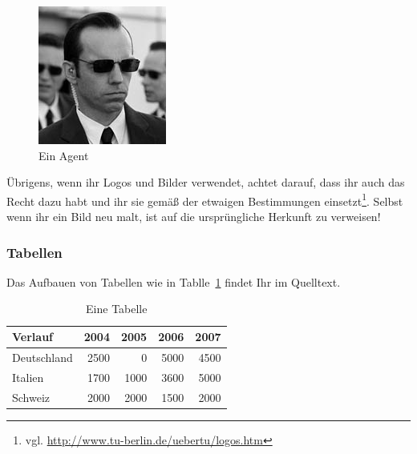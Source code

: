 \begin{figure}[htb]
	
	\centering
		
		\includegraphics{figures/agent.jpg}
	
	\caption{Ein Agent}
	
	\label{fig:agent}

\end{figure}

Übrigens, wenn ihr Logos und Bilder verwendet, achtet darauf, dass ihr auch das Recht dazu habt und ihr sie gemäß der etwaigen Bestimmungen einsetzt\footnote{vgl. \url{http://www.tu-berlin.de/uebertu/logos.htm}}. Selbst wenn ihr ein Bild neu malt, ist auf die ursprüngliche Herkunft zu verweisen!


\subsubsection{Tabellen}
Das Aufbauen von Tabellen wie in Tablle~\ref{tab:EineTabelle} findet Ihr im Quelltext.
\begin{table}[ht]
	\centering

	\caption{Eine Tabelle}

\begin{tabular}{||l|r|r|r|r||}

\hline
Verlauf &       2004 &       2005 &       2006 &       2007 \\

\hline
\hline
Deutschland &       2500 &          0 &       5000 &       4500 \\
\hline
   Italien &       1700 &       1000 &       3600 &       5000 \\
\hline
   Schweiz &       2000 &       2000 &       1500 &       2000 \\
\hline
\end{tabular}  
	\label{tab:EineTabelle}
\end{table}

